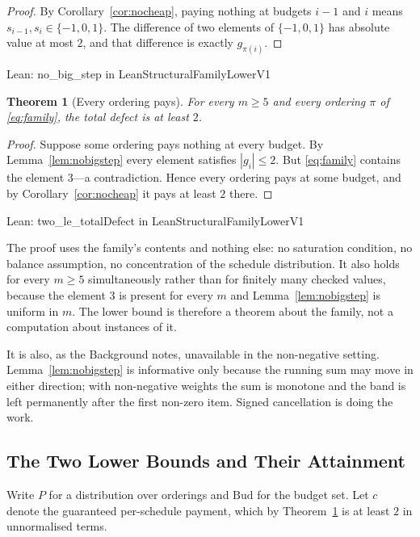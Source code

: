 \documentclass[conference]{IEEEtran}
\newtheorem{theorem}{Theorem}
\theoremstyle{definition}
\newcommand{\lean}[1]{\textsf{\footnotesize #1}}
\newcommand{\leanbox}[1]{%
  \par\vspace{2pt}\noindent
  {\footnotesize\textsf{Lean: #1}}\par\vspace{2pt}}
\begin{document}
\begin{proof}
By Corollary~\ref{cor:nocheap}, paying nothing at budgets $i-1$ and $i$ means
$s_{i-1},s_{i}\in\{-1,0,1\}$. The difference of two elements of $\{-1,0,1\}$ has absolute
value at most $2$, and that difference is exactly $g_{\pi(i)}$.
\end{proof}

\leanbox{\lean{no\_big\_step} in \lean{LeanStructuralFamilyLowerV1}}

\begin{theorem}[Every ordering pays]
\label{thm:everyorderpays}
For every $m\ge5$ and every ordering $\pi$ of \eqref{eq:family}, the total defect is at least
$2$.
\end{theorem}

\begin{proof}
Suppose some ordering pays nothing at every budget. By Lemma~\ref{lem:nobigstep} every
element satisfies $|g_{i}|\le2$. But \eqref{eq:family} contains the element $3$---a
contradiction. Hence every ordering pays at some budget, and by
Corollary~\ref{cor:nocheap} it pays at least $2$ there.
\end{proof}

\leanbox{\lean{two\_le\_totalDefect} in \lean{LeanStructuralFamilyLowerV1}}

The proof uses the family's contents and nothing else: no saturation condition, no balance
assumption, no concentration of the schedule distribution. It also holds for every $m\ge5$
simultaneously rather than for finitely many checked values, because the element $3$ is
present for every $m$ and Lemma~\ref{lem:nobigstep} is uniform in $m$. The lower bound is
therefore a theorem about the family, not a computation about instances of it.

It is also, as the Background notes, unavailable in the non-negative setting.
Lemma~\ref{lem:nobigstep} is informative only because the running sum may move in either
direction; with non-negative weights the sum is monotone and the band is left permanently
after the first non-zero item. Signed cancellation is doing the work.

\subsection{The Two Lower Bounds and Their Attainment}
\label{sec:bounds}

Write $P$ for a distribution over orderings and $\mathrm{Bud}$ for the budget set. Let $c$
denote the guaranteed per-schedule payment, which by Theorem~\ref{thm:everyorderpays} is at
least $2$ in unnormalised terms.
\end{document}
